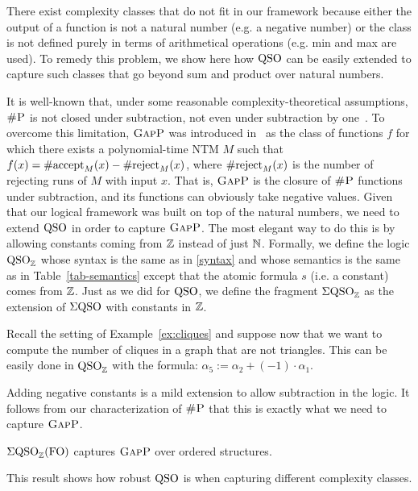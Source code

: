 
There exist complexity classes that do not fit in our framework because either the output of a function is not a natural number (e.g. a negative number) or the class is not defined purely in terms of arithmetical operations (e.g. min and max are used).
To remedy this problem, we show here how ${\rm QSO}$ can be easily extended to capture such classes that go beyond sum and product over natural numbers. 

It is well-known that, under some reasonable complexity-theoretical assumptions, $\text{\sc \#P}$ is not closed under subtraction, not even under subtraction by one~\cite{OH93}.
To overcome this limitation, $\text{\sc GapP}$ was introduced in~\cite{FFK94} as the class of functions $f$ for which there exists a polynomial-time NTM $M$ such that $f(x) = \text{\rm \#accept}_M(x) - \text{\rm \#reject}_M(x)$, where  $\text{\rm \#reject}_M(x)$ is the number of rejecting runs of $M$ with input $x$.
That is, $\text{\sc GapP}$ is the closure of $\text{\sc \#P}$ functions under subtraction, and its functions can obviously take negative values.
Given that our logical framework was built on top of the natural numbers, we need to extend ${\rm QSO}$ in order to %
capture $\text{\sc GapP}$. 
The most elegant way to do this is by allowing constants coming from $\mathbb{Z}$ instead of just $\mathbb{N}$. 
Formally, we define the logic ${\rm QSO}_{\mathbb{Z}}$ whose syntax is the same as in \eqref{syntax} and whose semantics is the same as in Table~\ref{tab-semantics} except that the atomic formula $s$ (i.e. a constant) comes from $\mathbb{Z}$.  
Just as we did for ${\rm QSO}$, we define the fragment $\Sigma{\rm QSO}_{\mathbb{Z}}$ as the extension of $\Sigma{\rm QSO}$ with constants in $\mathbb{Z}$.
\begin{example}
	Recall the setting of Example~\ref{ex:cliques} and suppose now that we want to compute the number of cliques in a graph that are not triangles. This can be easily done in ${\rm QSO}_{\mathbb{Z}}$ with the formula:
	$
	\alpha_5 :=	\alpha_2 + (-1) \cdot \alpha_1 
	$.
\end{example}
Adding negative constants is a mild extension to allow subtraction in the logic. 
It follows from our characterization of $\text{\sc \#P}$ that this is exactly what we need to capture  $\text{\sc GapP}$.
\begin{corollary} \label{prop:capture-gapp}
	$\Sigma{\rm QSO}_{\mathbb{Z}}({\rm FO})$ captures $\text{\sc GapP}$ over ordered structures.
\end{corollary}
This result shows how robust ${\rm QSO}$ is when capturing different complexity classes.

